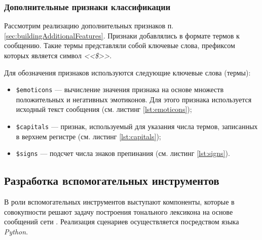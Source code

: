     \subsubsection{Дополнительные признаки классификации}
    Рассмотрим реализацию дополнительных признаков п.
    \ref{sec:buildingAdditionalFeatures}.
    Признаки добавлялись в формате термов к сообщению.
    Такие термы представляли собой ключевые слова, префиксом которых является
    символ {\it <<\$>>}.

    Для обозначения признаков используются следующие ключевые слова (термы):
    \begin{itemize}
        \item {\tt \$emoticons} --- вычисление значения признака на основе
            множеств положительных и негативных эмотиконов.
            Для этого признака используется исходный текст сообщения
            (см. листинг \ref{lst:emoticons});
        \item {\tt \$capitals} --- признак, используемый для указания числа термов,
            записанных в верхнем регистре (см. листинг \ref{lst:capitals});

        \item {\tt \$signs} --- подсчет числа знаков препинания (см. листинг
            \ref{lst:signs}).
    \end{itemize}

    \lstset{style=python}
    

    \lstset{style=python}
    

    \lstset{style=python}
    


\subsection{Разработка вспомогательных инструментов}
В роли вспомогательных инструментов выступают компоненты, которые в совокупности
решают задачу построения тонального лексикона на основе сообщений сети \twitter.
Реализация сценариев осуществляется посредством языка {\it Python}.

